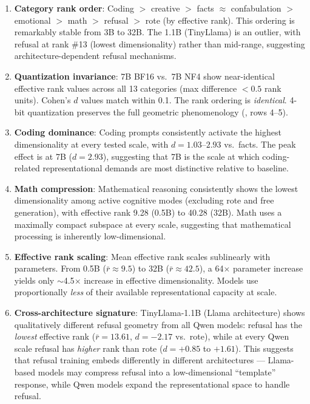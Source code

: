\documentclass[11pt,a4paper]{article}
\begin{document}
\begin{enumerate}[leftmargin=*]
    \item \textbf{Category rank order}: Coding $>$ creative $>$ facts $\approx$ confabulation $>$ emotional $>$ math $>$ refusal $>$ rote (by effective rank). This ordering is remarkably stable from 3B to 32B. The 1.1B (TinyLlama) is an outlier, with refusal at rank \#13 (lowest dimensionality) rather than mid-range, suggesting architecture-dependent refusal mechanisms.

    \item \textbf{Quantization invariance}: 7B BF16 vs.\ 7B NF4 show near-identical effective rank values across all 13 categories (max difference $< 0.5$ rank units). Cohen's $d$ values match within 0.1. The rank ordering is \emph{identical}. 4-bit quantization preserves the full geometric phenomenology (, rows 4--5).

    \item \textbf{Coding dominance}: Coding prompts consistently activate the highest dimensionality at every tested scale, with $d = 1.03$--$2.93$ vs.\ facts. The peak effect is at 7B ($d = 2.93$), suggesting that 7B is the scale at which coding-related representational demands are most distinctive relative to baseline.

    \item \textbf{Math compression}: Mathematical reasoning consistently shows the lowest dimensionality among active cognitive modes (excluding rote and free generation), with effective rank 9.28 (0.5B) to 40.28 (32B). Math uses a maximally compact subspace at every scale, suggesting that mathematical processing is inherently low-dimensional.

    \item \textbf{Effective rank scaling}: Mean effective rank scales sublinearly with parameters. From 0.5B ($\bar{r} \approx 9.5$) to 32B ($\bar{r} \approx 42.5$), a 64$\times$ parameter increase yields only $\sim$4.5$\times$ increase in effective dimensionality. Models use proportionally \emph{less} of their available representational capacity at scale.

    \item \textbf{Cross-architecture signature}: TinyLlama-1.1B (Llama architecture) shows qualitatively different refusal geometry from all Qwen models: refusal has the \emph{lowest} effective rank ($\bar{r} = 13.61$, $d = -2.17$ vs.\ rote), while at every Qwen scale refusal has \emph{higher} rank than rote ($d = +0.85$ to $+1.61$). This suggests that refusal training embeds differently in different architectures --- Llama-based models may compress refusal into a low-dimensional ``template'' response, while Qwen models expand the representational space to handle refusal.
\end{enumerate}
\end{document}
